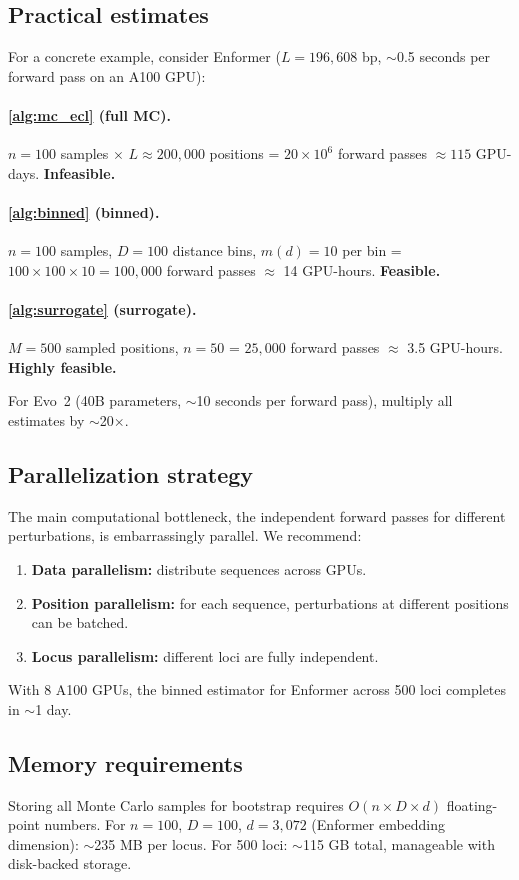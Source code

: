 \subsection{Practical estimates}

For a concrete example, consider Enformer ($L=196{,}608$ bp, $\sim$0.5 seconds per forward pass on an A100 GPU):

\paragraph{\cref{alg:mc_ecl} (full MC).}
$n=100$ samples $\times$ $L \approx 200{,}000$ positions = $20 \times 10^6$ forward passes $\approx 115$ GPU-days. \textbf{Infeasible.}

\paragraph{\cref{alg:binned} (binned).}
$n=100$ samples, $D=100$ distance bins, $m(d)=10$ per bin = $100 \times 100 \times 10 = 100{,}000$ forward passes $\approx$ 14 GPU-hours. \textbf{Feasible.}

\paragraph{\cref{alg:surrogate} (surrogate).}
$M=500$ sampled positions, $n=50$ = $25{,}000$ forward passes $\approx$ 3.5 GPU-hours. \textbf{Highly feasible.}

For Evo~2 (40B parameters, $\sim$10 seconds per forward pass), multiply all estimates by $\sim$20$\times$.

\subsection{Parallelization strategy}

The main computational bottleneck, the independent forward passes for different perturbations, is embarrassingly parallel. We recommend:
\begin{enumerate}[leftmargin=2em, label=(\roman*)]
\item \textbf{Data parallelism:} distribute sequences across GPUs.
\item \textbf{Position parallelism:} for each sequence, perturbations at different positions can be batched.
\item \textbf{Locus parallelism:} different loci are fully independent.
\end{enumerate}
With 8 A100 GPUs, the binned estimator for Enformer across 500 loci completes in $\sim$1 day.

\subsection{Memory requirements}

Storing all Monte Carlo samples for bootstrap requires $O(n \times D \times d)$ floating-point numbers. For $n=100$, $D=100$, $d=3{,}072$ (Enformer embedding dimension): $\sim$235 MB per locus. For 500 loci: $\sim$115 GB total, manageable with disk-backed storage.
